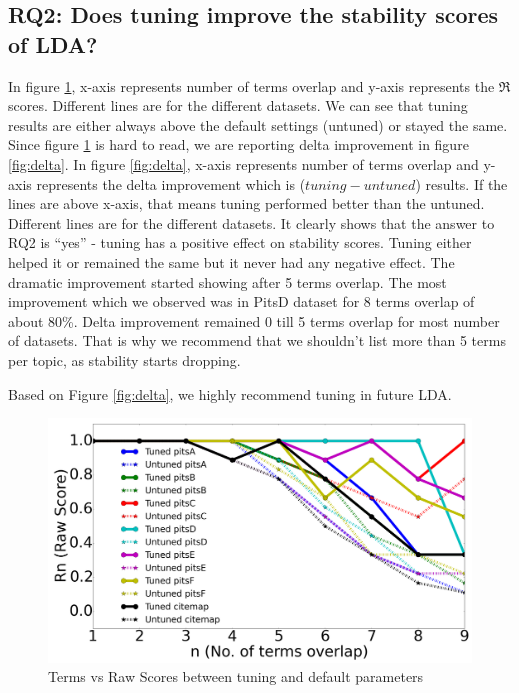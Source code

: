 \documentclass[10pt,conference]{IEEEtran}
\theoremstyle{break}
\begin{document}
\subsection{\textbf{RQ2: Does tuning improve the stability scores of LDA?}}

In figure \ref{fig:raw}, x-axis represents number of terms overlap and y-axis represents the $\Re$ scores. Different lines are for the different datasets. We can see that tuning results are either always above the default settings (untuned) or stayed the same. Since figure \ref{fig:raw} is hard to read, we are reporting delta improvement in figure \ref{fig:delta}. In figure \ref{fig:delta}, x-axis represents number of terms overlap and y-axis represents the delta improvement which is ($tuning - untuned$) results. If the lines are above x-axis, that means tuning performed better than the untuned. Different lines are for the different datasets. It clearly shows that the answer to RQ2 is “yes” - tuning has a positive effect on stability scores. Tuning either helped it or remained the same but it never had any negative effect. The dramatic improvement started showing after 5 terms overlap. The most improvement which we observed was in PitsD dataset for 8 terms overlap of about 80\%. Delta improvement remained 0 till 5 terms overlap for most number of datasets. That is why we recommend that we shouldn't list more than 5 terms per topic, as stability starts dropping.

\begin{lesson}
Based on Figure \ref{fig:delta}, we highly recommend tuning in future LDA.
\end{lesson}

\begin{center}
\begin{figure}[!htbp]
  \includegraphics[width=\linewidth]{./fig/raw_graph.png}
  \caption{Terms vs Raw Scores between tuning and default parameters}
  \label{fig:raw}
\end{figure}
\vspace{-2cm}
\end{center}
\end{document}
